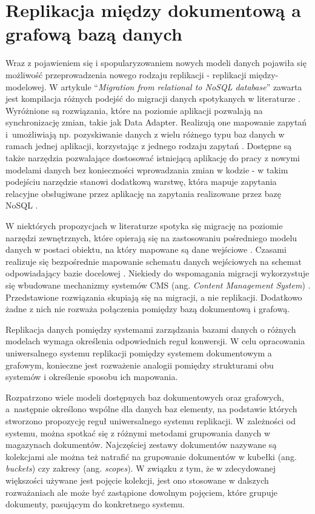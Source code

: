 \documentclass[a4paper,twoside,12pt]{book}
\newcommand{\obcy}[1]{\emph{#1}}
\newcommand{\ang}[1]{{\selectlanguage{british}\obcy{#1}}}
\begin{document}
\section{Replikacja między dokumentową a grafową bazą danych}

Wraz z pojawieniem się i spopularyzowaniem nowych modeli danych pojawiła się możliwość przeprowadzenia nowego rodzaju replikacji - replikacji między-modelowej. W artykule ``\textit{Migration from relational to NoSQL database}'' zawarta jest kompilacja różnych podejść do migracji danych spotykanych w literaturze \cite{bib:migration-from-relational-to-nosql-database}. Wyróżnione są rozwiązania, które na poziomie aplikacji pozwalają na synchronizację zmian, takie jak Data Adapter. Realizują one mapowanie zapytań i~umożliwiają np. pozyskiwanie danych z wielu różnego typu baz danych w ramach jednej aplikacji, korzystając z jednego rodzaju zapytań \cite{bib:data-adapter}. Dostępne są także narzędzia pozwalające dostosować istniejącą aplikację do pracy z nowymi modelami danych bez konieczności wprowadzania zmian w kodzie - w takim podejściu narzędzie stanowi dodatkową warstwę, która mapuje zapytania relacyjne obsługiwane przez aplikację na zapytania realizowane przez bazę NoSQL \cite{bib:a-framework-for-migrating-relational-datasets-to-nosql}. 

W niektórych propozycjach w literaturze spotyka się migrację na poziomie narzędzi zewnętrznych, które opierają się na zastosowaniu pośredniego modelu danych w postaci obiektu, na który mapowane są dane wejściowe \cite{bib:mid-model-design-used-in-model-transition}. Czasami realizuje się bezpośrednie mapowanie schematu danych wejściowych na schemat odpowiadający bazie docelowej \cite{bib:automatic-mapping-of-mysql-databases-to-nosql-mongodb}. Niekiedy do wspomagania migracji wykorzystuje się wbudowane mechanizmy systemów CMS (ang. \ang{Content Management System}) \cite{bib:migration-cms}. Przedstawione rozwiązania skupiają się na migracji, a nie replikacji. Dodatkowo żadne z nich nie rozważa połączenia pomiędzy bazą dokumentową i grafową.

Replikacja danych pomiędzy systemami zarządzania bazami danych o różnych modelach wymaga określenia odpowiednich reguł konwersji. W celu opracowania uniwersalnego systemu replikacji pomiędzy systemem dokumentowym a grafowym, konieczne jest rozważenie analogii pomiędzy strukturami obu systemów i określenie sposobu ich mapowania.

Rozpatrzono wiele modeli dostępnych baz dokumentowych oraz grafowych, a~następnie określono wspólne dla danych baz elementy, na podstawie których stworzono propozycję reguł uniwersalnego systemu replikacji. W zależności od systemu, można spotkać się z różnymi metodami grupowania danych w magazynach dokumentów. Najczęściej zestawy dokumentów nazywane są kolekcjami ale można też natrafić na grupowanie dokumentów w kubełki (ang. \ang{buckets}) czy zakresy (ang. \ang{scopes}). W związku z tym, że w zdecydowanej większości używane jest pojęcie kolekcji, jest ono stosowane w dalszych rozważaniach ale może być zastąpione dowolnym pojęciem, które grupuje dokumenty, pasującym do konkretnego systemu. 
\end{document}
